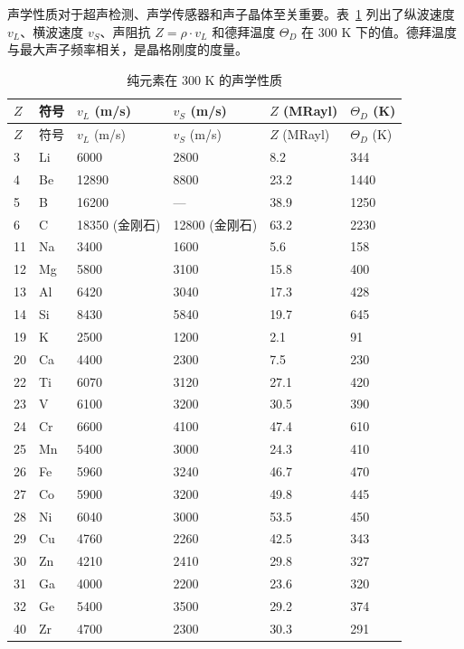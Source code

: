 \documentclass[12pt,a4paper]{article}
\begin{document}
	声学性质对于超声检测、声学传感器和声子晶体至关重要。表~\ref{tab:acoustic-properties-func} 列出了纵波速度 \(v_L\)、横波速度 \(v_S\)、声阻抗 \(Z = \rho \cdot v_L\) 和德拜温度 \(\Theta_D\) 在 300 K 下的值。德拜温度与最大声子频率相关，是晶格刚度的度量。
	
	\begin{longtable}{p{0.8cm}p{1.2cm}p{2.2cm}p{2.2cm}p{2.2cm}p{2.2cm}}
		\caption{纯元素在 300 K 的声学性质} \label{tab:acoustic-properties-func} \\
		\toprule
		\(Z\) & 符号 & \(v_L\) (m/s) & \(v_S\) (m/s) & \(Z\) (MRayl) & \(\Theta_D\) (K) \\
		\midrule
		\endfirsthead
		\toprule
		\(Z\) & 符号 & \(v_L\) (m/s) & \(v_S\) (m/s) & \(Z\) (MRayl) & \(\Theta_D\) (K) \\
		\midrule
		\endhead
		3  & Li & 6000 & 2800 & 8.2 & 344 \\
		4  & Be & 12890 & 8800 & 23.2 & 1440 \\
		5  & B  & 16200 & --- & 38.9 & 1250 \\
		6  & C  & 18350 (金刚石) & 12800 (金刚石) & 63.2 & 2230 \\
		11 & Na & 3400 & 1600 & 5.6 & 158 \\
		12 & Mg & 5800 & 3100 & 15.8 & 400 \\
		13 & Al & 6420 & 3040 & 17.3 & 428 \\
		14 & Si & 8430 & 5840 & 19.7 & 645 \\
		19 & K  & 2500 & 1200 & 2.1 & 91 \\
		20 & Ca & 4400 & 2300 & 7.5 & 230 \\
		22 & Ti & 6070 & 3120 & 27.1 & 420 \\
		23 & V  & 6100 & 3200 & 30.5 & 390 \\
		24 & Cr & 6600 & 4100 & 47.4 & 610 \\
		25 & Mn & 5400 & 3000 & 24.3 & 410 \\
		26 & Fe & 5960 & 3240 & 46.7 & 470 \\
		27 & Co & 5900 & 3200 & 49.8 & 445 \\
		28 & Ni & 6040 & 3000 & 53.5 & 450 \\
		29 & Cu & 4760 & 2260 & 42.5 & 343 \\
		30 & Zn & 4210 & 2410 & 29.8 & 327 \\
		31 & Ga & 4000 & 2200 & 23.6 & 320 \\
		32 & Ge & 5400 & 3500 & 29.2 & 374 \\
		40 & Zr & 4700 & 2300 & 30.3 & 291 \\

\end{longtable}
\end{document}
